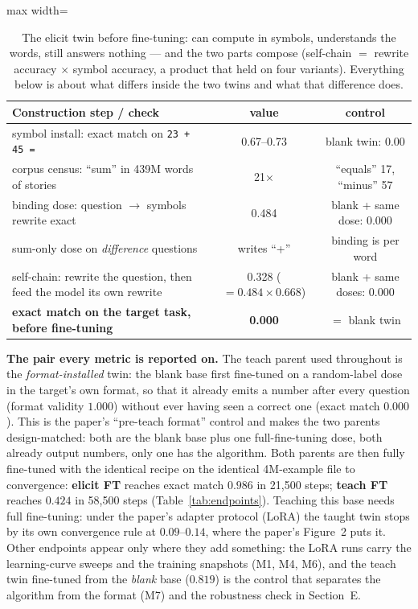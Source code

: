 \documentclass[11pt]{article}
\begin{document}
\begin{table}[h]\centering\small
\begin{adjustbox}{max width=\textwidth}
\begin{tabular}{lcc}
\toprule
Construction step / check & value & control \\
\midrule
symbol install: exact match on \texttt{23 + 45 = } & 0.67--0.73 & blank twin: 0.00 \\
corpus census: ``sum'' in 439M words of stories & 21$\times$ & ``equals'' 17, ``minus'' 57 \\
binding dose: question $\to$ symbols rewrite exact & 0.484 & blank + same dose: 0.000 \\
sum-only dose on \emph{difference} questions & writes ``+'' & binding is per word \\
self-chain: rewrite the question, then feed the model its own rewrite & 0.328 ($=0.484\times0.668$) & blank + same doses: 0.000 \\
\textbf{exact match on the target task, before fine-tuning} & \textbf{0.000} & $=$ blank twin \\
\bottomrule
\end{tabular}
\end{adjustbox}
\caption{The elicit twin before fine-tuning: can compute in symbols, understands the words, still
answers nothing --- and the two parts compose (self-chain $=$ rewrite accuracy $\times$ symbol
accuracy, a product that held on four variants). Everything below is
about what differs inside the two twins and what that difference does.}
\label{tab:premise}
\end{table}

\noindent\textbf{The pair every metric is reported on.} The teach parent used throughout is the
\emph{format-installed} twin: the blank base first fine-tuned on a random-label dose in the
target's own format, so that it already emits a number after every question (format validity
$1.000$) without ever having seen a correct one (exact match $0.000$). This is the paper's
``pre-teach format'' control and makes the two parents design-matched: both are the blank base
plus one full-fine-tuning dose, both already output numbers, only one has the algorithm. Both
parents are then fully fine-tuned with the identical recipe on the identical 4M-example file to
convergence: \textbf{elicit FT} reaches exact match $0.986$ in 21,500 steps; \textbf{teach FT}
reaches $0.424$ in 58,500 steps (Table~\ref{tab:endpoints}). Teaching this base needs full
fine-tuning: under the paper's adapter protocol (LoRA) the taught twin stops by its own
convergence rule at $0.09$--$0.14$, where the paper's Figure~2 puts it. Other endpoints appear
only where they add something: the LoRA runs carry the learning-curve sweeps and the training
snapshots (M1, M4, M6), and the teach twin fine-tuned from the \emph{blank} base ($0.819$) is
the control that separates the algorithm from the format (M7) and the robustness check in
Section~E.
\end{document}

